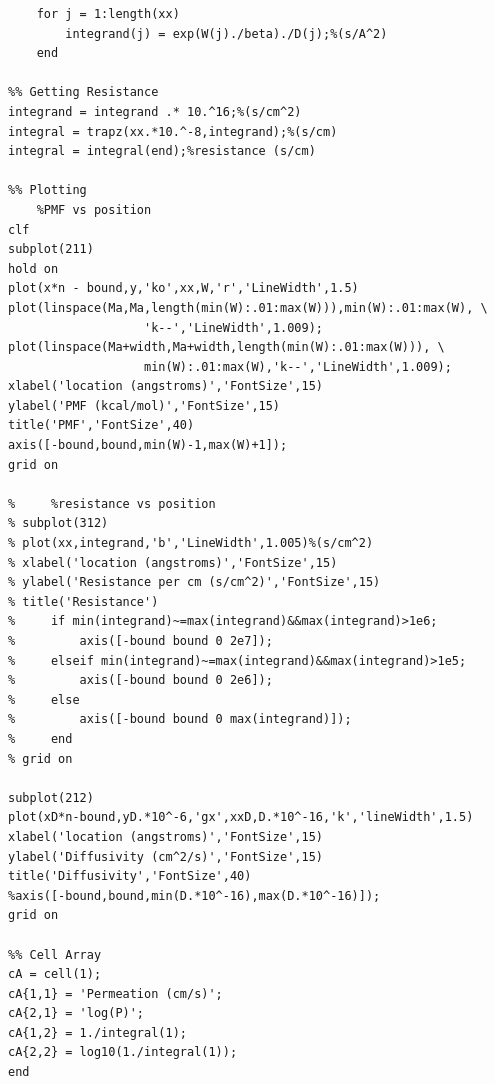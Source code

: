\begin{verbatim}
    for j = 1:length(xx)
        integrand(j) = exp(W(j)./beta)./D(j);%(s/A^2)
    end

%% Getting Resistance
integrand = integrand .* 10.^16;%(s/cm^2)
integral = trapz(xx.*10.^-8,integrand);%(s/cm)
integral = integral(end);%resistance (s/cm)

%% Plotting
    %PMF vs position
clf
subplot(211)
hold on
plot(x*n - bound,y,'ko',xx,W,'r','LineWidth',1.5)
plot(linspace(Ma,Ma,length(min(W):.01:max(W))),min(W):.01:max(W), \
                   'k--','LineWidth',1.009);
plot(linspace(Ma+width,Ma+width,length(min(W):.01:max(W))), \
                   min(W):.01:max(W),'k--','LineWidth',1.009);
xlabel('location (angstroms)','FontSize',15)
ylabel('PMF (kcal/mol)','FontSize',15)
title('PMF','FontSize',40)
axis([-bound,bound,min(W)-1,max(W)+1]);
grid on

%     %resistance vs position
% subplot(312)
% plot(xx,integrand,'b','LineWidth',1.005)%(s/cm^2)
% xlabel('location (angstroms)','FontSize',15)
% ylabel('Resistance per cm (s/cm^2)','FontSize',15)
% title('Resistance')
%     if min(integrand)~=max(integrand)&&max(integrand)>1e6;
%         axis([-bound bound 0 2e7]);
%     elseif min(integrand)~=max(integrand)&&max(integrand)>1e5;
%         axis([-bound bound 0 2e6]);
%     else
%         axis([-bound bound 0 max(integrand)]);
%     end
% grid on

subplot(212)
plot(xD*n-bound,yD.*10^-6,'gx',xxD,D.*10^-16,'k','lineWidth',1.5)
xlabel('location (angstroms)','FontSize',15)
ylabel('Diffusivity (cm^2/s)','FontSize',15)
title('Diffusivity','FontSize',40)
%axis([-bound,bound,min(D.*10^-16),max(D.*10^-16)]);
grid on

%% Cell Array
cA = cell(1);
cA{1,1} = 'Permeation (cm/s)';
cA{2,1} = 'log(P)';
cA{1,2} = 1./integral(1);
cA{2,2} = log10(1./integral(1));
end
\end{verbatim}